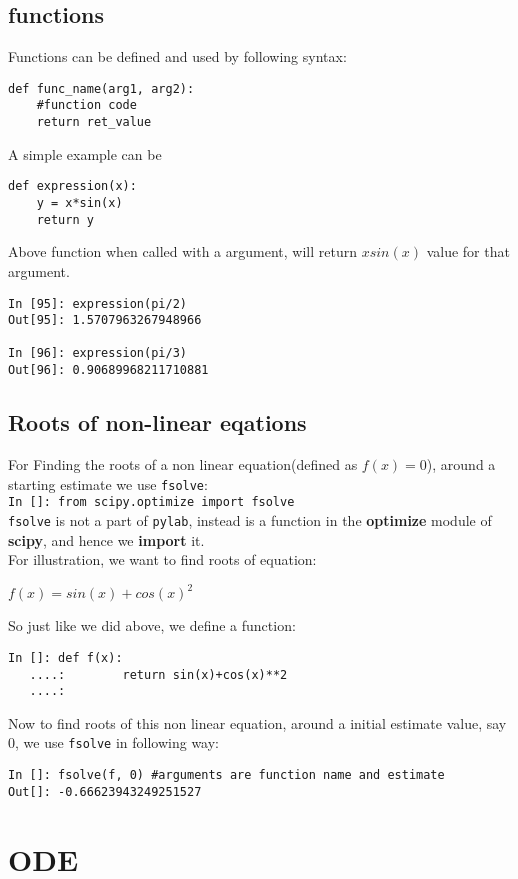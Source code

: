 \documentclass[12pt]{article}
\newcommand{\typ}[1]{\lstinline{#1}}
\begin{document}
\subsection{functions}
Functions can be defined and used by following syntax:
\begin{lstlisting}
def func_name(arg1, arg2):
    #function code
    return ret_value
\end{lstlisting}
A simple example can be
\begin{lstlisting}
def expression(x):
    y = x*sin(x)
    return y
\end{lstlisting}
Above function when called with a argument, will return $xsin(x)$ value for that argument.
\begin{lstlisting}
In [95]: expression(pi/2)
Out[95]: 1.5707963267948966

In [96]: expression(pi/3)
Out[96]: 0.90689968211710881
\end{lstlisting}
\subsection{Roots of non-linear eqations}
For Finding the roots of a non linear equation(defined as $f(x)=0$), around a starting estimate we use \typ{fsolve}:\\
\typ{In []: from scipy.optimize import fsolve}\\
\typ{fsolve} is not a part of \typ{pylab}, instead is a function in the \textbf{optimize} module of \textbf{scipy}, and hence we \textbf{import} it.\\
For illustration, we want to find roots of equation:
\begin{center}
  $f(x)=sin(x)+cos(x)^2$
\end{center}
So just like we did above, we define a function:
\begin{lstlisting}
In []: def f(x):
   ....:        return sin(x)+cos(x)**2
   ....: 
\end{lstlisting}
Now to find roots of this non linear equation, around a initial estimate value, say 0, we use \typ{fsolve} in following way:
\begin{lstlisting}
In []: fsolve(f, 0) #arguments are function name and estimate
Out[]: -0.66623943249251527
\end{lstlisting}

\section{ODE}
\end{document}

